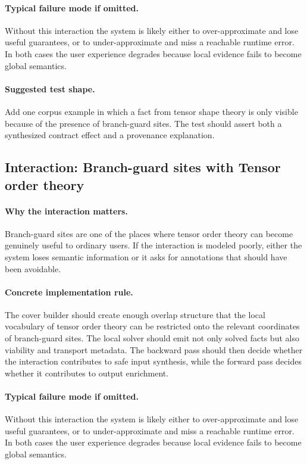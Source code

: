 \documentclass[11pt]{report}
\theoremstyle{definition}
\theoremstyle{plain}
\begin{document}
\paragraph{Typical failure mode if omitted.}
Without this interaction the system is likely either to over-approximate and
lose useful guarantees, or to under-approximate and miss a reachable runtime
error. In both cases the user experience degrades because local evidence
fails to become global semantics.

\paragraph{Suggested test shape.}
Add one corpus example in which a fact from tensor shape theory is only
visible because of the presence of branch-guard sites. The test should
assert both a synthesized contract effect and a provenance explanation.

\subsection{Interaction: Branch-guard sites with Tensor order theory}

\paragraph{Why the interaction matters.}
Branch-guard sites are one of the places where tensor order theory can become
genuinely useful to ordinary users. If the interaction is modeled poorly,
either the system loses semantic information or it asks for annotations that
should have been avoidable.

\paragraph{Concrete implementation rule.}
The cover builder should create enough overlap structure that the local
vocabulary of tensor order theory can be restricted onto the relevant
coordinates of branch-guard sites. The local solver should emit not only
solved facts but also viability and transport metadata. The backward pass
should then decide whether the interaction contributes to safe input
synthesis, while the forward pass decides whether it contributes to output
enrichment.

\paragraph{Typical failure mode if omitted.}
Without this interaction the system is likely either to over-approximate and
lose useful guarantees, or to under-approximate and miss a reachable runtime
error. In both cases the user experience degrades because local evidence
fails to become global semantics.
\end{document}
